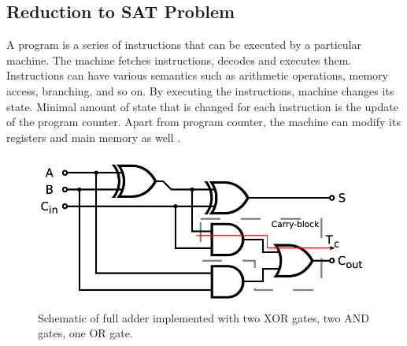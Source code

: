 \documentclass[12pt]{article}
\begin{document}
\subsection{Reduction to SAT Problem}

A program is a series of instructions that can be executed by a particular
machine. The machine fetches instructions, decodes  and executes them.
Instructions can have various semantics such as arithmetic operations, memory
access, branching, and so on. By executing the instructions, machine changes
its state. Minimal amount of state that is changed for each instruction is the
update of the program counter. Apart from program counter, the machine can
modify its registers and main memory as well \cite{flynn2007computer}.


\begin{figure}
    \includegraphics[width=\linewidth]{assets/full_adder_schematic.png}
    \centering
    \caption{
        Schematic of full adder implemented with two XOR gates, two AND gates,
        one OR gate.
    }
    \label{fig:full_adder_schematic}
\end{figure}
\end{document}
